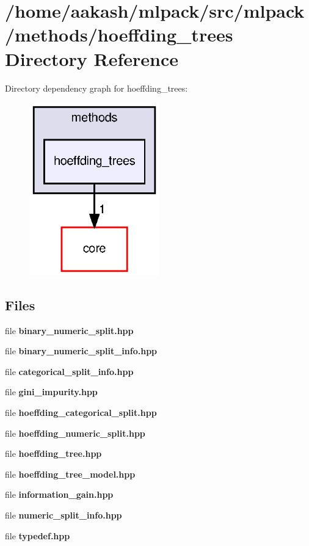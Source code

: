 \section{/home/aakash/mlpack/src/mlpack/methods/hoeffding\+\_\+trees Directory Reference}
\label{dir_9728dd99c5f8edcf7fb9ef7255873dbb}
Directory dependency graph for hoeffding\+\_\+trees\+:
\nopagebreak
\begin{figure}[H]
\begin{center}
\leavevmode
\includegraphics[width=160pt]{dir_9728dd99c5f8edcf7fb9ef7255873dbb_dep}
\end{center}
\end{figure}
\subsection*{Files}
\begin{DoxyCompactItemize}
\item 
file \textbf{ binary\+\_\+numeric\+\_\+split.\+hpp}
\item 
file \textbf{ binary\+\_\+numeric\+\_\+split\+\_\+info.\+hpp}
\item 
file \textbf{ categorical\+\_\+split\+\_\+info.\+hpp}
\item 
file \textbf{ gini\+\_\+impurity.\+hpp}
\item 
file \textbf{ hoeffding\+\_\+categorical\+\_\+split.\+hpp}
\item 
file \textbf{ hoeffding\+\_\+numeric\+\_\+split.\+hpp}
\item 
file \textbf{ hoeffding\+\_\+tree.\+hpp}
\item 
file \textbf{ hoeffding\+\_\+tree\+\_\+model.\+hpp}
\item 
file \textbf{ information\+\_\+gain.\+hpp}
\item 
file \textbf{ numeric\+\_\+split\+\_\+info.\+hpp}
\item 
file \textbf{ typedef.\+hpp}
\end{DoxyCompactItemize}
